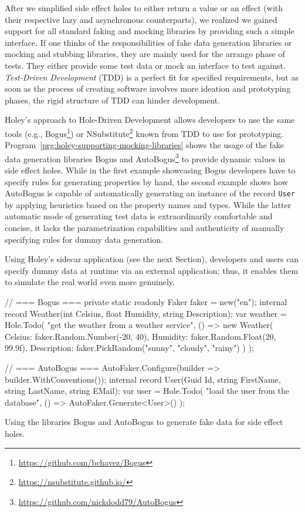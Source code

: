 After we simplified side effect holes to either return a value or an effect (with their respective lazy and asynchronous counterparts), we realized we gained support for all standard faking and mocking libraries by providing such a simple interface.
If one thinks of the responsibilities of fake data generation libraries or mocking and stubbing libraries, they are mainly used for the arrange phase of tests.
They either provide some test data or mock an interface to test against.
\emph{Test-Driven Development} (TDD) is a perfect fit for specified requirements, but as soon as the process of creating software involves more ideation and prototyping phases, the rigid structure of TDD can hinder development.

Holey's approach to Hole-Driven Development allows developers to use the same tools (e.g., Bogus\footnote{\url{https://github.com/bchavez/Bogus}}) or NSubstitute\footnote{\url{https://nsubstitute.github.io/}} known from TDD to use for prototyping.
Program~\ref{prg:holey-supporting-mocking-libraries} shows the usage of the fake data generation libraries Bogus and AutoBogus\footnote{\url{https://github.com/nickdodd79/AutoBogus}} to provide dynamic values in side effect holes.
While in the first example showcasing Bogus developers have to specify rules for generating properties by hand, the second example shows how AutoBogus is capable of automatically generating an instance of the record \texttt{User} by applying heuristics based on the property names and types.
While the latter automatic mode of generating test data is extraordinarily comfortable and concise, it lacks the parametrization capabilities and authenticity of manually specifying rules for dummy data generation.

Using Holey's sidecar application (see the next Section), developers and users can specify dummy data at runtime via an external application; thus, it enables them to simulate the real world even more genuinely.

\begin{program}[ht]
\begin{CsCode}
// === Bogus ===
private static readonly Faker faker = new("en");
internal record Weather(int Celsius, float Humidity, string Description);
var weather = Hole.Todo(
	"get the weather from a weather service",
	() =>
		new Weather(
			Celsius: faker.Random.Number(-20, 40),
			Humidity: faker.Random.Float(20, 99.9f),
			Description: faker.PickRandom("sunny", "cloudy", "rainy")
		)
);

// === AutoBogus ===
AutoFaker.Configure(builder => builder.WithConventions());
internal record User(Guid Id, string FirstName, string LastName, string EMail);
var user = Hole.Todo(
    "load the user from the database",
    () => AutoFaker.Generate<User>()
);
\end{CsCode}
\caption{Using the libraries Bogus and AutoBogus to generate fake data for side effect holes.}
\label{prg:holey-supporting-mocking-libraries}
\end{program}

